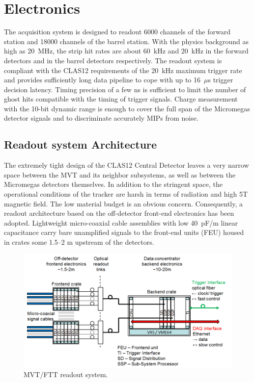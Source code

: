 \section{Electronics}

The acquisition system is designed to readout 6000 channels of the forward station and 18000 channels of the barrel station. With the physics background as high as 20~MHz, the strip hit rates are about 60~kHz and 20~kHz in the forward detectors and in the barrel detectors respectively. The readout system is compliant with the CLAS12 requirements of the 20~kHz maximum trigger rate and provides sufficiently long data pipeline to cope with up to 16~$\mu$s trigger decision latency. Timing precision of a few ns is sufficient to limit the number of ghost hits compatible with the timing of trigger signals. Charge measurement with the 10-bit dynamic range is enough to cover the full span of the Micromegas detector signals and to discriminate accurately MIPs from noise.

\subsection{Readout system Architecture}
The extremely tight design of the CLAS12 Central Detector leaves a very narrow space between the MVT and its neighbor subsystems, as well as between the Micromegas detectors themselves.  In addition to the stringent space, the operational conditions of the tracker are harsh in terms of radiation and high 5T magnetic field. The low material budget is an obvious concern. Consequently, a readout architecture based on the off-detector front-end electronics has been adopted. Lightweight micro-coaxial cable assemblies with low 40~pF/m linear capacitance carry bare unamplified signals to the front-end units (FEU) housed in crates some 1.5--2 m upstream of the detectors. 

\begin{figure}[htb]
 \includegraphics[width=1.0\columnwidth,keepaspectratio]{images/electronics_fig1.png}
 \caption{MVT/FTT readout system.}
 \label{fig:mm-e_1}
\end{figure}

